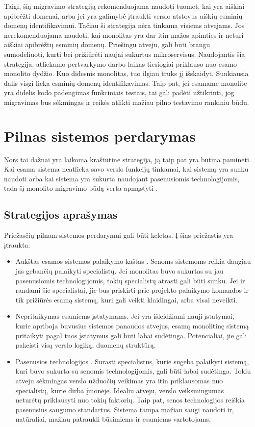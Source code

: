 \documentclass[fleqn]{VUMIFPSkursinis}
\begin{document}
Taigi, šią migravimo strategiją rekomenduojama naudoti tuomet, kai yra aiškiai apibrėžti domenai, arba jei yra galimybė įtraukti verslo atstovus aiškių esminių domenų identifikavimui. Tačiau ši strategija nėra tinkama visiems atvejams. Jos nerekomenduojama naudoti, kai monolitas yra dar itin mažos apimties ir neturi aiškiai apibrėžtų esminių domenų. Priešingu atveju, gali būti brangu sumodeliuoti, kurti bei prižiūrėti naujai sukurtus mikroservisus. Naudojantis šia strategija, atliekamo pertvarkymo darbo laikas tiesiogiai priklauso nuo esamo monolito dydžio. Kuo didesnis monolitas, tuo ilgiau truks jį išskaidyt. Sunkiausia dalis visgi lieka esminių domenų identifikavimas. Taip pat, jei esamame monolite yra didelis kodo padengimas funkciniais testais, tai gali padėti užtikrinti, jog migravimas bus sėkmingas ir reikės atlikti mažiau pilno testavimo rankiniu būdu.

\section{Pilnas sistemos perdarymas}
Nors tai dažnai yra laikoma kraštutine strategija, ją taip pat yra būtina paminėti. Kai esama sistema neatlieka savo verslo funkcijų tinkamai, kai sistemą yra sunku naudoti arba kai sistema yra sukurta naudojant pasenusiomis technologijomis, tada šį monolito migravimo būdą verta apmąstyti \cite{MQO18}.

\subsection{Strategijos aprašymas}
Priežasčių pilnam sistemos perdarymui gali būti keletas. Į šias priežastis yra įtraukta:
\begin{itemize}
    \item Aukštas esamos sistemos palaikymo kaštas \cite{Gli21}. Senoms sistemoms reikia daugiau jas gebančių palaikyti specialistų. Jei monolitas buvo sukurtas su jau pasenusiomis technologijomis, tokių specialistų atrasti gali būti sunku. Jei ir randami šie specialistai, jie bus priskirti prie projekto palaikymo komandos ir tik prižiūrės esamą sistemą, kuri gali veikti klaidingai, arba visai neveikti.
    \item Nepritaikymas esamiems įstatymams. Jei yra išleidžiami nauji įstatymai, kurie apriboja buvusius sistemos panaudos atvejus, esamą monolitinę sistemą pritaikyti pagal tuos įstatymus gali būti labai sudėtinga. Potencialiai, jie gali pakeisti visą verslo logiką, duomenų struktūrą.
    \item Pasenusios technologijos \cite{MQO18}. Surasti specialistus, kurie sugeba palaikyti sistemą, kuri buvo sukurta su senomis technologijomis, gali būti labai sudėtinga. Tokiu atveju sėkmingas verslo užduočių veikimas  yra itin priklausomas nuo specialistų, kurie dirba įmonėje. Idealiu atveju, verslo veiksmingumas neturėtų priklausyti nuo tokių faktorių. Taip pat, senos technologijos reiškia pasenusius saugumo standartus. Sistema tampa mažiau saugi naudoti ir, natūraliai, mažiau patraukli būsimiems ir esamiems vartotojams.
\end{itemize}
\end{document}
